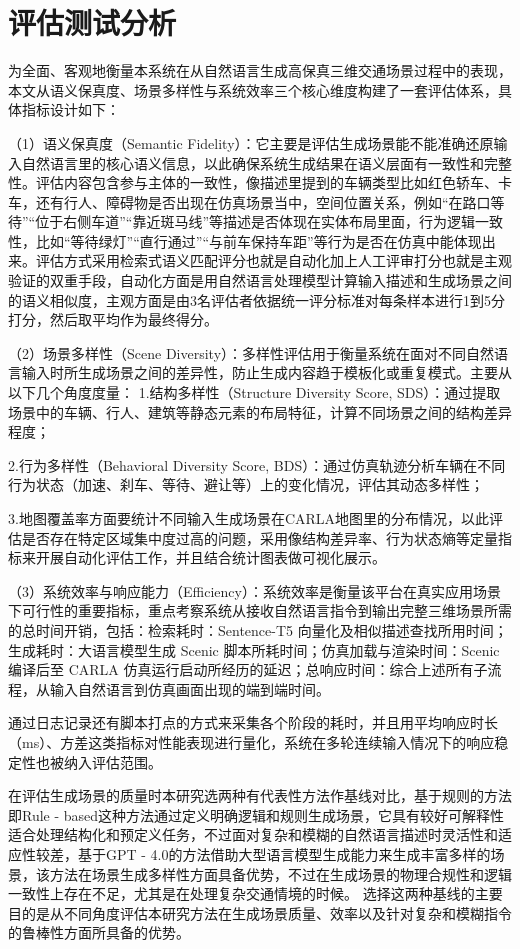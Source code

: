 \section{评估测试分析}
为全面、客观地衡量本系统在从自然语言生成高保真三维交通场景过程中的表现，本文从语义保真度、场景多样性与系统效率三个核心维度构建了一套评估体系，具体指标设计如下：

（1）语义保真度（Semantic Fidelity）：它主要是评估生成场景能不能准确还原输入自然语言里的核心语义信息，以此确保系统生成结果在语义层面有一致性和完整性。评估内容包含参与主体的一致性，像描述里提到的车辆类型比如红色轿车、卡车，还有行人、障碍物是否出现在仿真场景当中，空间位置关系，例如“在路口等待”“位于右侧车道”“靠近斑马线”等描述是否体现在实体布局里面，行为逻辑一致性，比如“等待绿灯”“直行通过”“与前车保持车距”等行为是否在仿真中能体现出来。评估方式采用检索式语义匹配评分也就是自动化加上人工评审打分也就是主观验证的双重手段，自动化方面是用自然语言处理模型计算输入描述和生成场景之间的语义相似度，主观方面是由3名评估者依据统一评分标准对每条样本进行1到5分打分，然后取平均作为最终得分。

（2）场景多样性（Scene Diversity）：多样性评估用于衡量系统在面对不同自然语言输入时所生成场景之间的差异性，防止生成内容趋于模板化或重复模式。主要从以下几个角度度量：
1.结构多样性（Structure Diversity Score, SDS）：通过提取场景中的车辆、行人、建筑等静态元素的布局特征，计算不同场景之间的结构差异程度；

2.行为多样性（Behavioral Diversity Score, BDS）：通过仿真轨迹分析车辆在不同行为状态（加速、刹车、等待、避让等）上的变化情况，评估其动态多样性；

3.地图覆盖率方面要统计不同输入生成场景在CARLA地图里的分布情况，以此评估是否存在特定区域集中度过高的问题，采用像结构差异率、行为状态熵等定量指标来开展自动化评估工作，并且结合统计图表做可视化展示。

（3）系统效率与响应能力（Efficiency）：系统效率是衡量该平台在真实应用场景下可行性的重要指标，重点考察系统从接收自然语言指令到输出完整三维场景所需的总时间开销，包括：检索耗时：Sentence-T5 向量化及相似描述查找所用时间；生成耗时：大语言模型生成 Scenic 脚本所耗时间；仿真加载与渲染时间：Scenic 编译后至 CARLA 仿真运行启动所经历的延迟；总响应时间：综合上述所有子流程，从输入自然语言到仿真画面出现的端到端时间。

通过日志记录还有脚本打点的方式来采集各个阶段的耗时，并且用平均响应时长（ms）、方差这类指标对性能表现进行量化，系统在多轮连续输入情况下的响应稳定性也被纳入评估范围。

在评估生成场景的质量时本研究选两种有代表性方法作基线对比，基于规则的方法即Rule - based这种方法通过定义明确逻辑和规则生成场景，它具有较好可解释性适合处理结构化和预定义任务，不过面对复杂和模糊的自然语言描述时灵活性和适应性较差，基于GPT - 4.0的方法借助大型语言模型生成能力来生成丰富多样的场景，该方法在场景生成多样性方面具备优势，不过在生成场景的物理合规性和逻辑一致性上存在不足，尤其是在处理复杂交通情境的时候。
选择这两种基线的主要目的是从不同角度评估本研究方法在生成场景质量、效率以及针对复杂和模糊指令的鲁棒性方面所具备的优势。\\




